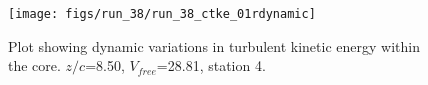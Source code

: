 \begin{figure}[H]
\centering
\texttt{[image: figs/run\_38/run\_38\_ctke\_01rdynamic]}
\caption{Plot showing dynamic variations in turbulent kinetic energy within the core. $z/c$=8.50, $V_{free}$=28.81, station 4.}
\label{fig:run_38_ctke_01rdynamic}
\end{figure}


